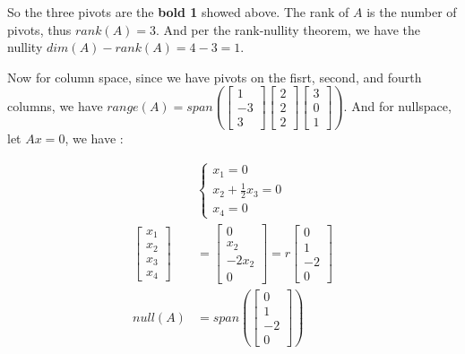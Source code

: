 \documentclass[11pt]{article}
\providecommand{\qbm}[1]{\begin{bmatrix} #1 \end{bmatrix}}
\begin{document}
So the three pivots are the \textbf{bold 1} showed above. The rank of $A$ is the number of pivots, thus $rank(A) = 3$. And per the rank-nullity theorem, we have the nullity $dim(A) - rank(A) = 4 - 3 = 1$.

Now for column space, since we have pivots on the fisrt, second, and fourth columns, we have $range(A) = span(\qbm{ 1\\ -3 \\ 3} \qbm{2 \\ 2\\ 2} \qbm{3 \\ 0 \\1})$. And for nullspace, let $Ax = 0$, we have :

\begin{align*}
    &\begin{cases}
        x_1 = 0  \\
        x_2 + \frac{1}{2} x_3 = 0 \\
        x_4 = 0
    \end{cases} \\
    \qbm{x_1 \\ x_2 \\ x_3 \\ x_4} &= \qbm{0 \\ x_2 \\ -2 x_2 \\ 0} = r\qbm{0 \\ 1 \\ -2  \\ 0} \\
    null(A) &= span(\qbm{0 \\ 1 \\ -2  \\ 0})
\end{align*}
\end{document}
